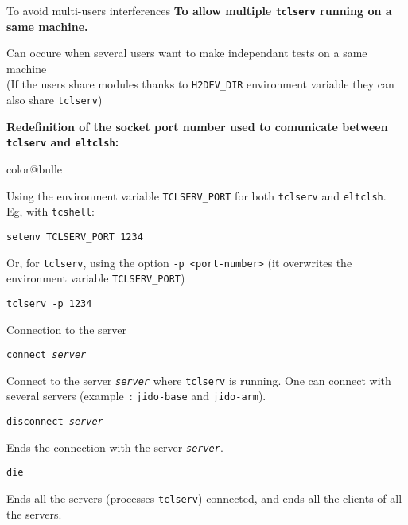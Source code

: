 \documentclass[a4paper,landscape,smooth]{show}
\begin{document}
\begin{tslide}{To avoid multi-users interferences}
   \vfill
   {\bf To allow multiple \texttt{tclserv} running on a same machine.}

	Can occure when several users want to make independant tests on
	a same machine\\
	(If the users share modules thanks to {\tt H2DEV\_DIR}
	environment variable they can also share {\tt tclserv})

   {\bf Redefinition of the socket port number used to comunicate between \texttt{tclserv} and \texttt{eltclsh}:}
   \begin{bitemize}{color@bulle}
      \item Using the environment variable \texttt{TCLSERV\_PORT} for
	    both \texttt{tclserv} and \texttt{eltclsh}. \\
Eg, with \texttt{tcshell}:\\
   \begin{cartouche}
   \texttt{setenv TCLSERV\_PORT 1234}
   \end{cartouche}   
	 
      \item Or, for \texttt{tclserv}, using the  option {\tt -p
	    <port-number>} (it overwrites the environment variable \texttt{TCLSERV\_PORT})\\
   \begin{cartouche}
   \texttt{tclserv -p 1234}
   \end{cartouche}   

   \end{bitemize}

   \vfill
\end{tslide}


\begin{tslide}{Connection to the server}
   \vfill
   \begin{cartouche}
   \texttt{connect {\em server}}
   \end{cartouche}   
   Connect to the server \texttt{\em server} where \texttt{tclserv} is running. One can connect with several servers (example~: \texttt{jido-base} and \texttt{jido-arm}).
   \vfill
   \begin{cartouche}
   \texttt{disconnect {\em server}}
   \end{cartouche}   
   Ends the connection with the server \texttt{\em server}.
   \vfill
   \begin{cartouche}
   \texttt{die}
   \end{cartouche}   
   Ends all the servers (processes \texttt{tclserv}) connected, and
   ends all the clients of all the servers.
   \vfill
\end{tslide}
\end{document}
